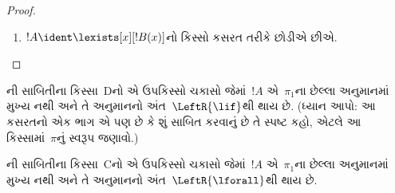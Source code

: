 \documentclass[../../../include/open-logic-section]{subfiles}
\begin{document}
\begin{proof}
\begin{enumerate}
\[\LeftSubproofLabel{$\pi_1$}
\AxiomC{}
\RightLabel{$\pi_2'$}
\Deduce$!B(t), \lforall[x][!B(x)], \Gamma \fCenter \Delta$
\RightLabel{\LeftR{\lforall}}
\UnaryInf$\lforall[x][!B(x)], \Gamma \fCenter \Delta$
\RightSubproofLabel{$\pi_2$}
\RightLabel{\CutCS}
\BinaryInf$\Gamma \fCenter \Delta$
\DisplayProof
\]
આગમન-પૂર્વધારણા વડે આમાંથી
\CutCS{} દૂર કરી શકાય છે:
\[
\AxiomC{}
\RightLabel{$\pi_1''$}
\Deduce$!B(t), \Gamma \fCenter \Delta, \lforall[x][!B(x)]$
\AxiomC{}
\RightLabel{$\pi_2'$}
\Deduce$!B(t), \lforall[x][!B(x)], \Gamma \fCenter \Delta$
\RightLabel{\CutCS}
\BinaryInf$!B(t), \Gamma \fCenter \Delta$
\DisplayProof
\]
અહીં~$\pi_1''$ એ~$\pi_1$માંથી
(~$\pi_1'$માંથી નહીં!)
!!{height} જાળવતા શિથિલીકરણથી મળે છે.
(આ !!{proof}નો કટ-ક્રમ સમાન છે,
પણ કટની !!{height} ઓછી છે.)
તેથી $!B(t), \Gamma \fCenter \Delta$ની
!!a{proof}~$\pi_2''$ મળે છે.

!!{proof}~$\pi_1'$નો અંતિમ સિક્વન્ટ
$\Gamma \Sequent \Delta, !B(c)$ છે,
જ્યાં~$c$ એ~$\RightR{\lforall}$
અનુમાનનો સ્વચલ છે.
તેથી~$c$ એ~$!B(x)$, $\Gamma$
કે~$\Delta$માં આવતો નથી.
!!{proof}~$\pi$ નિયમિત છે એમ ધારીએ,
એટલે~$c$ માત્ર ત્યાર પછી આવતા
$\RightR{\lforall}$ અનુમાનનો જ સ્વચલ છે
અને તેની ઉપર જ આવે છે;
અર્થાત્, તે માત્ર~$\pi_1'$માં આવે છે
અને~$\pi_1'$ની અંદરના કોઈ અનુમાનનો
સ્વચલ નથી. કારણ કે~$c$ એ~$\pi_2$માં
આવતો નથી, તે~$t$માં પણ આવતો નથી.
 મુજબ
!!{proof}~$\Subst{\pi_1'}{t}{c}$ એ
$\Gamma \Sequent \Delta, !B(t)$ની
!!a{proof} છે. હવે નીચેની
!!{proof} પર આગમન-પૂર્વધારણા લગાવીએ:
\[
\AxiomC{}
\RightLabel{$\Subst{\pi_1'}{t}{c}$}
\Deduce$\Gamma \fCenter \Delta, !B(t)$
\AxiomC{}
\RightLabel{$\pi_2''$}
\Deduce$!B(t), \Gamma \fCenter \Delta$
\RightLabel{\CutCS}
\BinaryInf$\Gamma \fCenter \Delta$
\DisplayProof
\]
(આગમન-પૂર્વધારણા લાગુ પડે છે,
કારણ કે કટ !!{formula}~$!B(t)$ છે;
એટલે આ !!{proof}નો કટ-ક્રમ~$\pi$
કરતાં ઓછો છે.)
\item $!A \ident \lexists[x][!B(x)]$નો
કિસ્સો કસરત તરીકે છોડીએ છીએ.
\end{enumerate}
\end{proof}

\begin{prob}
ની સાબિતીના કિસ્સા~Dનો
એ ઉપકિસ્સો ચકાસો જેમાં~$!A$ એ~$\pi_1$ના
છેલ્લા અનુમાનમાં મુખ્ય નથી અને તે અનુમાનનો
અંત~$\LeftR{\lif}$થી થાય છે.
(ધ્યાન આપો: આ કસરતનો એક ભાગ એ પણ છે કે
શું સાબિત કરવાનું છે તે સ્પષ્ટ કહો,
એટલે આ કિસ્સામાં~$\pi$નું સ્વરૂપ જણાવો.)
\end{prob}

\begin{prob}
ની સાબિતીના કિસ્સા~Cનો
એ ઉપકિસ્સો ચકાસો જેમાં~$!A$ એ~$\pi_1$ના
છેલ્લા અનુમાનમાં મુખ્ય નથી અને તે અનુમાનનો
અંત~$\LeftR{\lforall}$થી થાય છે.
\end{prob}
\end{document}
